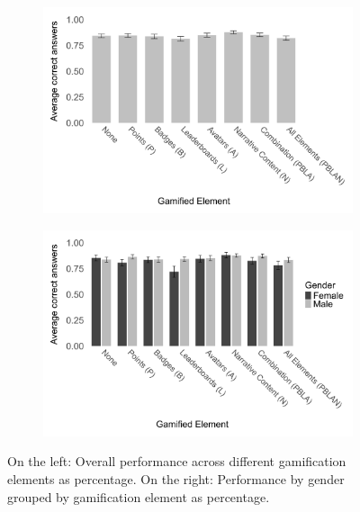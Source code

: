 \begin{figure}[h]
    \centering
    \begin{subfigure}[b]{0.45\textwidth}
        \includegraphics[width=\textwidth]{img/plots/grey/plot_performance.png}
        \label{fig:plot_performance}
    \end{subfigure}
    \hfill
    \begin{subfigure}[b]{0.45\textwidth}
        \includegraphics[width=\textwidth]{img/plots/grey/plot_performance_gender.png}
        \label{fig:plot_performance_gender}
    \end{subfigure}
    \caption{On the left: Overall performance across different gamification elements as percentage. On the right: Performance by gender grouped by gamification element as percentage.}
    \label{fig:performance_comparison}
\end{figure}

